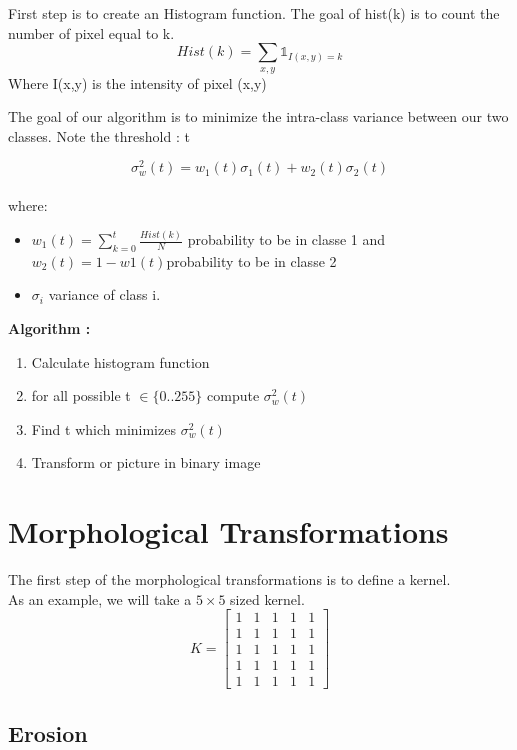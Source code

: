 \documentclass{article}
\begin{document}
First step is to create an Histogram function. The goal of hist(k) is to count the number of pixel equal to k. 
$$Hist(k) = \sum_{x,y} \mathds{1}_{I(x,y) = k} $$
Where I(x,y) is the intensity of pixel (x,y)

\vspace{0.5 cm}

The goal of our algorithm is to minimize the intra-class variance between our two classes.
Note the threshold : t

$$\sigma_w^2(t) = w_1(t)\sigma_1(t) + w_2(t)\sigma_2(t)$$
\\
where: 
\begin{itemize}
 \item $w_1(t) = \sum_{k = 0}^t \frac{Hist(k)}{N}$ probability to be in classe 1 and $w_2(t) = 1 - w1(t) $probability to be in classe 2
 \item $\sigma_i$ variance of class i.
\end{itemize}
\vspace{1 cm}
\textbf{Algorithm :}
\begin{enumerate}
\item  Calculate histogram function 
\item  for all possible t $\in \{0..255\}$ compute $\sigma_w^2(t)$ 
\item Find t which minimizes $\sigma_w^2(t)$ 
\item Transform or picture in binary image
\end{enumerate}
\vspace{1 cm}

\section{Morphological Transformations}

The first step of the morphological transformations is to define a kernel.\\
As an example, we will take a $5 \times 5$ sized kernel.
$$K = \begin{bmatrix} 1 & 1 & 1 & 1 & 1 \\ 1 & 1 & 1 & 1 & 1 \\1 & 1 & 1 & 1 & 1 \\1 & 1 & 1 & 1 & 1 \\1 & 1 & 1 & 1 & 1  \end{bmatrix}$$

\subsection{Erosion}
\end{document}
